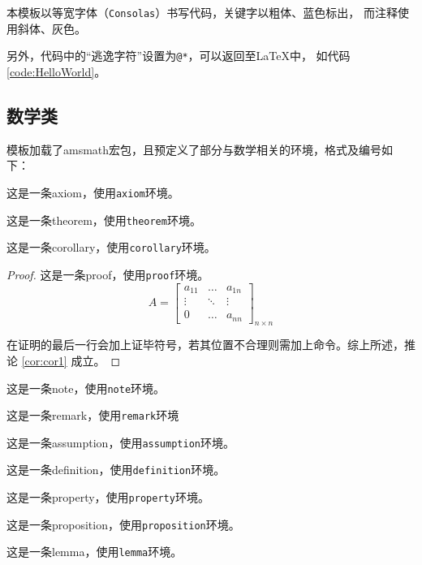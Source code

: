 		本模板以等宽字体（\texttt{Consolas}）书写代码，关键字以粗体、蓝色标出，
		而注释使用斜体、灰色。

		另外，代码中的``逃逸字符''设置为\texttt{@*}，可以返回至\LaTeX{}中，
        如代码 \ref{code:HelloWorld}。
        
    \subsection{数学类}\label{subsec:math}
        模板加载了\textsf{amsmath}宏包，且预定义了部分与数学相关的环境，格式及编号如下：
        \begin{axiom}
            这是一条axiom，使用\texttt{axiom}环境。
        \end{axiom}
        \begin{theorem}[某某定理]   %
            这是一条theorem，使用\texttt{theorem}环境。
        \end{theorem}
        \begin{corollary}[一条推论]\label{cor:cor1}
            这是一条corollary，使用\texttt{corollary}环境。
        \end{corollary}
        \begin{proof}
            这是一条proof，使用\texttt{proof}环境。
            \[
                A=\begin{bmatrix}
                    a_{11} & \dots  & a_{1n}\\
                    \vdots & \ddots & \vdots \\
                    0      & \ldots & a_{nn}
                \end{bmatrix}_{n\times n}
            \]

            在证明的最后一行会加上证毕符号，若其位置不合理则需加上命令。综上所述，推论 \ref{cor:cor1} 成立。
        \end{proof}
        \begin{note}
            这是一条note，使用\texttt{note}环境。
        \end{note}
        \begin{remark}
            这是一条remark，使用\texttt{remark}环境
        \end{remark}
        \begin{assumption}
            这是一条assumption，使用\texttt{assumption}环境。
        \end{assumption}
        \begin{definition}
            这是一条definition，使用\texttt{definition}环境。
        \end{definition}
        \begin{property}
            这是一条property，使用\texttt{property}环境。
        \end{property}
        \begin{proposition}
            这是一条proposition，使用\texttt{proposition}环境。
        \end{proposition}
        \begin{lemma}
            这是一条lemma，使用\texttt{lemma}环境。
        \end{lemma}

